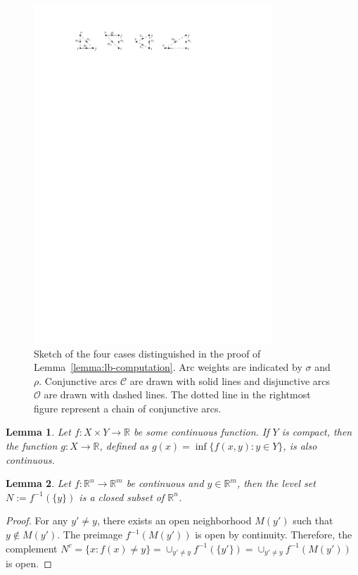 \documentclass[a4paper]{report}
\theoremstyle{definition}
\theoremstyle{plain}
\newtheorem{lemma}{Lemma}[chapter]
\begin{document}
\begin{figure}
  \centering
  \includegraphics[width=0.8\textwidth]{figures/single/lower-bound-lemma.pdf}
  \caption{Sketch of the four cases distinguished in the proof of Lemma~\ref{lemma:lb-computation}. Arc
    weights are indicated by $\sigma$ and $\rho$. Conjunctive arcs $\mathcal{C}$
    are drawn with solid lines and disjunctive arcs $\mathcal{O}$ are drawn with
    dashed lines. The dotted line in the rightmost figure represent a chain of
    conjunctive arcs.}\label{fig:lb-computation}
\end{figure}

\begin{lemma}\label{lemma:inf-continuous}
  Let $f : X \times Y \rightarrow \mathbb{R}$ be some continuous function. If
  $Y$ is compact, then the function $g : X \rightarrow \mathbb{R}$, defined as
  $g(x) = \inf \{ f(x,y) : y\in Y\}$, is also continuous.
\end{lemma}

\begin{lemma}\label{lemma:levelset}
  Let $f :\mathbb{R}^{n} \rightarrow \mathbb{R}^{m}$ be continuous and
  $y \in \mathbb{R}^{m}$, then the level set $N := f^{-1}(\{ y \})$ is a closed
  subset of $\mathbb{R}^{n}$.
\end{lemma}
\begin{proof}
  For any $y' \neq y$, there exists an open neighborhood $M(y')$ such that
  $y \notin M(y')$. The preimage $f^{-1}(M(y'))$ is open by continuity.
  Therefore, the complement
  $N^{c} = \{ x : f(x) \neq y \} = \cup_{y' \neq y} f^{-1}(\{y'\}) = \cup_{y' \neq y} f^{-1}(M(y'))$
  is open.
\end{proof}
\end{document}
